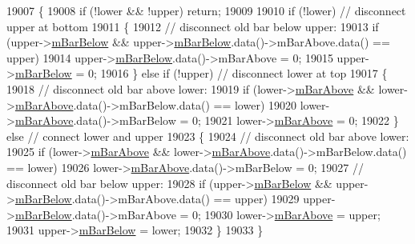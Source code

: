 \begin{DoxyCode}
19007 \{
19008   \textcolor{keywordflow}{if} (!lower && !upper) \textcolor{keywordflow}{return};
19009   
19010   \textcolor{keywordflow}{if} (!lower) \textcolor{comment}{// disconnect upper at bottom}
19011   \{
19012     \textcolor{comment}{// disconnect old bar below upper:}
19013     \textcolor{keywordflow}{if} (upper->\hyperlink{class_q_c_p_bars_ad51db970eed7e286f2753b0216fc56de}{mBarBelow} && upper->\hyperlink{class_q_c_p_bars_ad51db970eed7e286f2753b0216fc56de}{mBarBelow}.data()->mBarAbove.data() == upper)
19014       upper->\hyperlink{class_q_c_p_bars_ad51db970eed7e286f2753b0216fc56de}{mBarBelow}.data()->mBarAbove = 0;
19015     upper->\hyperlink{class_q_c_p_bars_ad51db970eed7e286f2753b0216fc56de}{mBarBelow} = 0;
19016   \} \textcolor{keywordflow}{else} \textcolor{keywordflow}{if} (!upper) \textcolor{comment}{// disconnect lower at top}
19017   \{
19018     \textcolor{comment}{// disconnect old bar above lower:}
19019     \textcolor{keywordflow}{if} (lower->\hyperlink{class_q_c_p_bars_a0c1c46076c41a478dbb373cfd35929aa}{mBarAbove} && lower->\hyperlink{class_q_c_p_bars_a0c1c46076c41a478dbb373cfd35929aa}{mBarAbove}.data()->mBarBelow.data() == lower)
19020       lower->\hyperlink{class_q_c_p_bars_a0c1c46076c41a478dbb373cfd35929aa}{mBarAbove}.data()->mBarBelow = 0;
19021     lower->\hyperlink{class_q_c_p_bars_a0c1c46076c41a478dbb373cfd35929aa}{mBarAbove} = 0;
19022   \} \textcolor{keywordflow}{else} \textcolor{comment}{// connect lower and upper}
19023   \{
19024     \textcolor{comment}{// disconnect old bar above lower:}
19025     \textcolor{keywordflow}{if} (lower->\hyperlink{class_q_c_p_bars_a0c1c46076c41a478dbb373cfd35929aa}{mBarAbove} && lower->\hyperlink{class_q_c_p_bars_a0c1c46076c41a478dbb373cfd35929aa}{mBarAbove}.data()->mBarBelow.data() == lower)
19026       lower->\hyperlink{class_q_c_p_bars_a0c1c46076c41a478dbb373cfd35929aa}{mBarAbove}.data()->mBarBelow = 0;
19027     \textcolor{comment}{// disconnect old bar below upper:}
19028     \textcolor{keywordflow}{if} (upper->\hyperlink{class_q_c_p_bars_ad51db970eed7e286f2753b0216fc56de}{mBarBelow} && upper->\hyperlink{class_q_c_p_bars_ad51db970eed7e286f2753b0216fc56de}{mBarBelow}.data()->mBarAbove.data() == upper)
19029       upper->\hyperlink{class_q_c_p_bars_ad51db970eed7e286f2753b0216fc56de}{mBarBelow}.data()->mBarAbove = 0;
19030     lower->\hyperlink{class_q_c_p_bars_a0c1c46076c41a478dbb373cfd35929aa}{mBarAbove} = upper;
19031     upper->\hyperlink{class_q_c_p_bars_ad51db970eed7e286f2753b0216fc56de}{mBarBelow} = lower;
19032   \}
19033 \}
\end{DoxyCode}


